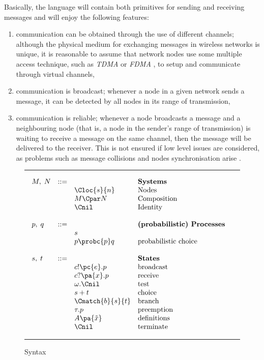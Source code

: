 \documentclass{LMCS}
\begin{document}
Basically, the language will contain both primitives for sending and receiving messages and 
will enjoy the following features:
\begin{enumerate}[label=(\roman*)]
\item communication can be obtained through the use of different channels; although the physical medium 
for exchanging messages in wireless networks is unique, it is reasonable to assume that network nodes use 
some multiple access technique, such as \emph{TDMA} or \emph{FDMA} \cite{tanenbaum}, to setup and 
communicate through virtual channels,
\item communication is broadcast; whenever a node in a given network sends a message, it can be detected by 
all nodes in its range of transmission,
\item communication is reliable; whenever a node broadcasts 
a message and a neighbouring node (that is, 
a node in the sender's range of transmission) is waiting 
to receive a message on the same channel, then the 
message will be delivered to the receiver. This is not 
ensured if low level issues are considered, 
as problems such as message collisions \cite{macsurvey}
and nodes synchronisation \cite{time} arise .
\end{enumerate}

\begin{figure}[t]
\rule{\linewidth}{0.5mm}
  \begin{align*}
&
\begin{array}{lcll}
  M,\;N  &::=&                 &\textbf{Systems} \\
         &  &  \Cloc{s}{n}    & \text{Nodes} \\
         &  & M \Cpar N       &  \text{Composition}\\
         &  & \Cnil           & \text{Identity}
\\\\
  p,\;q  &::=&                 &\textbf{(probabilistic) Processes}\\
         &  & s               &\\
         &  &   p \probc{p} q &\text{probabilistic choice} \\
\\
  s,\;t  &::= &               &\textbf{States}\\
         &     &c!\pc{e}.p           &\text{broadcast}\\
         &    &c?\pa{x}.p            &\text{receive}\\
         &    &\omega.\Cnil            &\text{test}\\
         &    &  s + t              &\text{choice} \\
         &    &\Cmatch{b}{s}{t}     &\text{branch}\\
         &    &  \tau.p             &\text{preemption}\\
         &     & A\pa{\tilde{x}}    &\text{definitions}\\
         &    & \Cnil               &\text{terminate}
\end{array}
\end{align*}

  \caption{Syntax \label{fig:syntax}}
 \rule{\linewidth}{0.5mm} 
\end{figure}
\end{document}
